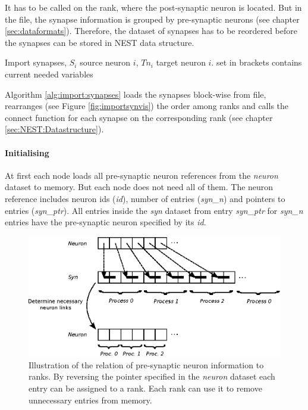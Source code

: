 It has to be called on the rank, where the post-synaptic neuron is located.
But in the file, the synapse information is grouped by pre-synaptic neurons (see chapter \ref{sec:dataformats}).
Therefore, the dataset of synapses has to be reordered before the synapses can be stored in NEST data structure.
\begin{algorithm}[ht!]
	\caption{Import synapses, $S_i$ source neuron $i$, $Tn_i$ target neuron $i$.
	set in brackets contains current needed variables}
\label{alg:import:synapses}
\end{algorithm}

Algorithm \ref{alg:import:synapses} loads the synapses block-wise from file, rearranges (see Figure \ref{fig:importsynvis}) the order
among ranks and calls the connect function for each synapse on the corresponding rank (see chapter \ref{sec:NEST:Datastructure}).

\newpage
\paragraph{Initialising}
At first each node loads all pre-synaptic neuron references from the \emph{neuron} dataset to memory.
But each node does not need all of them. 
The neuron reference includes neuron ids (\emph{id}), number of entries  (\emph{syn\_n}) and pointers to entries (\emph{syn\_ptr}).
All entries inside the \emph{syn} dataset from  entry \emph{syn\_ptr} for \emph{syn\_n} entries have the pre-synaptic neuron specified by its \emph{id}.
\begin{figure}[ht!]
\centering
\includegraphics[scale=1.0]{pictures/NeuronLinksRemoving.eps}
\caption[Illustration of the relation of pre-synaptic neuron information to ranks]{Illustration of the relation of pre-synaptic neuron information to ranks.
By reversing the pointer specified in the \emph{neuron} dataset
each entry can be assigned to a rank.
Each rank can use it to remove unnecessary entries from memory.
}
\label{fig:neuonlinksremoving}
\end{figure}

